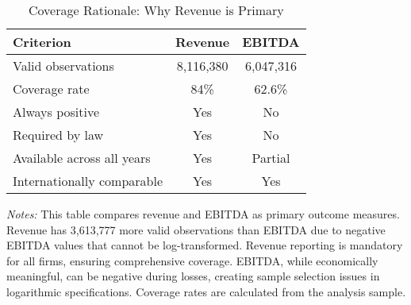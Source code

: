 \begin{table}[htbp]\centering
\caption{Coverage Rationale: Why Revenue is Primary}
\begin{tabular}{lcc}
\toprule
Criterion & Revenue & EBITDA \\
\midrule
Valid observations &    8,116,380 &    6,047,316 \\
Coverage rate & 84\% & 62.6\% \\
Always positive & Yes & No \\
Required by law & Yes & No \\
Available across all years & Yes & Partial \\
Internationally comparable & Yes & Yes \\
\bottomrule
\end{tabular}
\begin{minipage}{\textwidth}
\footnotesize
\textit{Notes:} This table compares revenue and EBITDA as primary outcome measures. 
Revenue has    3,613,777 more valid observations than EBITDA due to 
negative EBITDA values that cannot be log-transformed. Revenue reporting is 
mandatory for all firms, ensuring comprehensive coverage. EBITDA, while economically 
meaningful, can be negative during losses, creating sample selection issues in 
logarithmic specifications. Coverage rates are calculated from the analysis sample.
\end{minipage}
\end{table}
